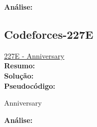 \textbf{Análise:}



\subsection{Codeforces-227E}
\href{http://codeforces.com/contest/227/problem/E}{227E - Anniversary}\\

\textbf{Resumo:}
\\

\textbf{Solução:}
\\

\textbf{Pseudocódigo:}
\begin{algorithm}
\caption{Anniversary}
\begin{algorithmic}[1]

\EndProcedure
\end{algorithmic}
\end{algorithm}


\textbf{Análise:}


